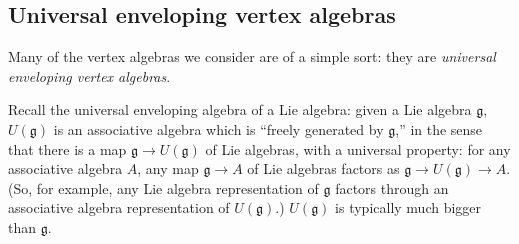 \documentclass[12pt,letterpaper,reqno]{amsart}
\numberwithin{equation}{section}
\newcommand{\fg}{{\mathfrak g}}
\newcommand{\bbZ}{\ensuremath{\mathbb Z}}
\newcommand{\vertex}{\mathcal{V}}
\newcommand{\ti}[1]{\textit{#1}}
\begin{document}







\subsection{Universal enveloping vertex algebras}

Many of the vertex algebras we consider are of a simple sort:
they are \ti{universal enveloping vertex algebras}.

Recall the universal enveloping algebra of a Lie algebra:
given a Lie algebra $\fg$, $U(\fg)$ is an 
associative algebra which is ``freely generated by $\fg$,''
in the sense that there is a map $\fg \to U(\fg)$ of Lie algebras, 
with a universal property: 
for any associative algebra $A$, any map $\fg \to A$ of Lie
algebras factors as $\fg \to U(\fg) \to A$. (So, for example, any Lie algebra representation of $\fg$ 
factors through an associative algebra representation of $U(\fg)$.)
$U(\fg)$ is typically much bigger than $\fg$.
\end{document}
